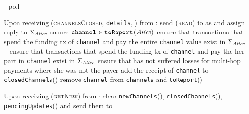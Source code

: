 \begin{systembox}{\fpaynet - poll}
\begin{algorithmic}[1]
    \State Upon receiving (\textsc{channelsClosed}, \texttt{details}, \alice)
    from \simulator:
    \Indent
      \State send (\textsc{read}) to \ledger{} as \alice{} and assign reply to
      $\Sigma_{\mathit{Alice}}$
        \State ensure $\mathtt{channel} \in
        \mathtt{toReport}\left(\mathit{Alice}\right)$
          \State ensure that transactions that spend the funding tx of
          \texttt{channel} and pay \alice{} the entire \texttt{channel} value
          exist in $\Sigma_{\mathit{Alice}}$
        \Else \ 
          \State ensure that transactions that spend the funding tx of
          \texttt{channel} and pay \alice{} the her part in \texttt{channel}
          exist in $\Sigma_{\mathit{Alice}}$
          \State ensure that \alice{} has not suffered losses for multi-hop
          payments where she was not the payer
        \EndIf
        \State add the receipt of \texttt{channel} to
        \texttt{closedChannels}(\alice)
        \State remove \texttt{channel} from \texttt{channels} and
        \texttt{toReport}(\alice)
      \EndFor
    \EndIndent
    \State

    \State Upon receiving (\textsc{getNew}) from \alice:
    \Indent
      \State clear \texttt{newChannels}(\alice),
      \texttt{closedChannels}(\alice), \texttt{pendingUpdates}(\alice) and send
      them to \alice
    \EndIndent
    \State
  \end{algorithmic}
\end{systembox}
